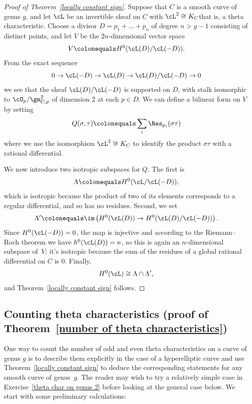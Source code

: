 \begin{proof}[Proof of Theorem~\ref{locally constant sign}] Suppose that $C$ is a smooth curve of genus $g$, and
let $\cL$ be
an invertible sheaf on $C$ with $\cL^2 \cong K_C$\emdash that is, a theta
characteristic. Choose a divisor $D = p_1 + \dots + p_n$ of degree $n>
g-1$ consisting of distinct points, and let $V$ be the $2n$-dimensional
vector space
$$
V \colonequals  H^0( \cL(D) / \cL(-D) ).
$$
From the exact sequence
$$
0\to \cL(-D) \to \cL(D) \to \cL(D)/\cL(-D) \to 0
$$
we see that
the sheaf $ \cL(D) / \cL(-D)$ is supported on $D$, with stalk
isomorphic to $\cO_p/\gm_{C,p}^2$ of dimension 2 at each $p \in D$. We
can define a bilinear form on $V$ by setting
%
$$
Q(\sigma, \tau) \colonequals  \sum_i \Res_{p_i}(\sigma \tau)
\vspace*{-3pt}
$$
where we use the isomorphism $\cL^2 \cong K_C$ to identify the product
$\sigma\tau$ with a rational differential.

We now introduce two isotropic subspaces for $Q$.
The first is
$$
\Lambda \colonequals  H^0( \cL / \cL(-D) ),
$$
which
is isotropic because the product
of two of its elements
corresponds to a regular differential, and so has no residues.
Second, we set
$$
\Lambda' \colonequals  \im\left( H^0(\cL(D)) \to H^0( \cL(D) / \cL(-D) ) \right)
.
$$
Since  $H^0(\cL(-D)) = 0$, the map is injective and according to
the Riemann--Roch theorem we have
$h^0(\cL(D)) = n$, so this is again an $n$-dimensional
subspace of~$V$; it's isotropic because the sum of the residues of a
global rational differential on $C$ is 0. Finally,
$$
H^0(\cL) \cong \Lambda \cap \Lambda',
$$
and Theorem~\ref{locally constant sign} follows.
\end{proof}




\subsection*{Counting theta characteristics (proof of Theorem~\ref{number of theta characteristics})}

One
way to count the number of odd and even theta characteristics on
\label{theta characteristic count} %
a curve of genus $g$ is  to describe
them
explicitly in the case of
a hyperelliptic curve and
use Theorem~\ref{locally constant sign}
to deduce the corresponding statements for any smooth curve of genus~$g$.
The reader
may wish to
try a relatively simple case in
Exercise~\ref{theta char on genus 2} before looking at the general
case below.
We start with some preliminary calculations:

